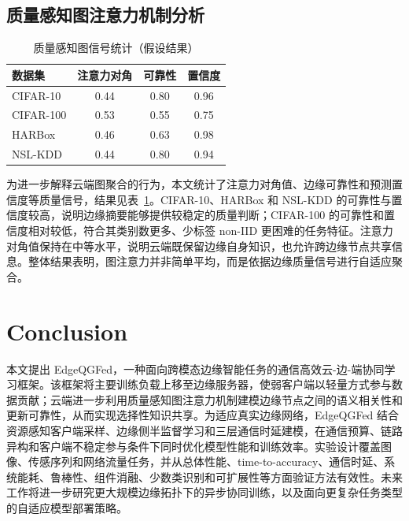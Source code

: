\documentclass[journal]{IEEEtran}
\begin{document}
\subsection{质量感知图注意力机制分析}
\label{subsec:graph_analysis}
\begin{table}[t]
\centering
\caption{质量感知图信号统计（假设结果）}
\label{tab:graph_signal}
\begin{tabular}{lccc}
\toprule
数据集 & 注意力对角 & 可靠性 & 置信度 \\
\midrule
CIFAR-10 & 0.44 & 0.80 & 0.96\\
CIFAR-100 & 0.53 & 0.55 & 0.75\\
HARBox & 0.46 & 0.63 & 0.98  \\
NSL-KDD & 0.44 & 0.80 & 0.94 \\
\bottomrule
\end{tabular}
\end{table}
为进一步解释云端图聚合的行为，本文统计了注意力对角值、边缘可靠性和预测置信度等质量信号，结果见表~\ref{tab:graph_signal}。CIFAR-10、HARBox 和 NSL-KDD 的可靠性与置信度较高，说明边缘摘要能够提供较稳定的质量判断；CIFAR-100 的可靠性和置信度相对较低，符合其类别数更多、少标签 non-IID 更困难的任务特征。注意力对角值保持在中等水平，说明云端既保留边缘自身知识，也允许跨边缘节点共享信息。整体结果表明，图注意力并非简单平均，而是依据边缘质量信号进行自适应聚合。

\section{Conclusion}
本文提出 EdgeQGFed，一种面向跨模态边缘智能任务的通信高效云-边-端协同学习框架。该框架将主要训练负载上移至边缘服务器，使弱客户端以轻量方式参与数据贡献；云端进一步利用质量感知图注意力机制建模边缘节点之间的语义相关性和更新可靠性，从而实现选择性知识共享。为适应真实边缘网络，EdgeQGFed 结合资源感知客户端采样、边缘侧半监督学习和三层通信时延建模，在通信预算、链路异构和客户端不稳定参与条件下同时优化模型性能和训练效率。实验设计覆盖图像、传感序列和网络流量任务，并从总体性能、time-to-accuracy、通信时延、系统能耗、鲁棒性、组件消融、少数类识别和可扩展性等方面验证方法有效性。未来工作将进一步研究更大规模边缘拓扑下的异步协同训练，以及面向更复杂任务类型的自适应模型部署策略。

% 
% 
\end{document}
